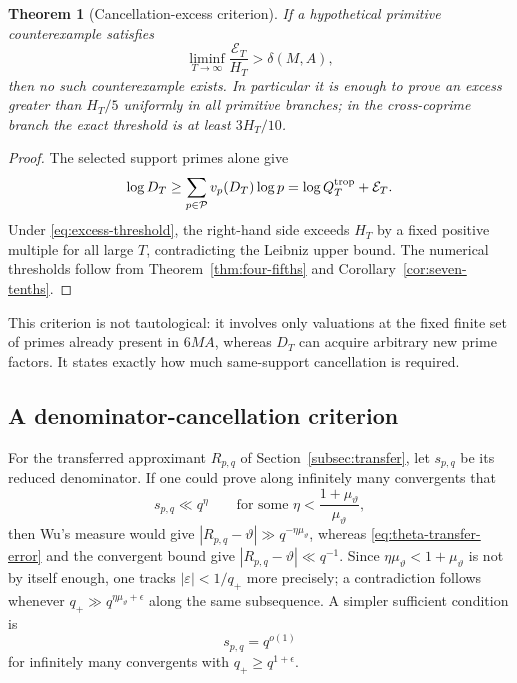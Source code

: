 \documentclass[11pt,oneside]{article}
\newtheorem{theorem}{Theorem}[section]
\theoremstyle{definition}
\theoremstyle{remark}
\begin{document}
\begin{theorem}[Cancellation-excess criterion]\label{thm:excess-criterion}
If a hypothetical primitive counterexample satisfies
\begin{equation}\label{eq:excess-threshold}
 \liminf_{T\to\infty}\frac{\mathcal E_T}{H_T}
 >\delta(M,A),
\end{equation}
then no such counterexample exists.  In particular it is enough to prove an excess greater
than $H_T/5$ uniformly in all primitive branches; in the cross-coprime branch the exact
threshold is at least $3H_T/10$.
\end{theorem}

\begin{proof}
The selected support primes alone give
\[
 \log D_T
 \ge\sum_{p\in\mathcal P}v_p(D_T)\log p
 =\log Q_T^{\rm trop}+\mathcal E_T.
\]
Under \eqref{eq:excess-threshold}, the right-hand side exceeds $H_T$ by a fixed positive
multiple for all large $T$, contradicting the Leibniz upper bound.  The numerical thresholds
follow from Theorem~\ref{thm:four-fifths} and Corollary~\ref{cor:seven-tenths}.
\end{proof}

This criterion is not tautological: it involves only valuations at the fixed finite set of
primes already present in $6MA$, whereas $D_T$ can acquire arbitrary new prime factors.  It
states exactly how much same-support cancellation is required.

\subsection{A denominator-cancellation criterion}

For the transferred approximant $R_{p,q}$ of Section~\ref{subsec:transfer}, let $s_{p,q}$ be
its reduced denominator.  If one could prove along infinitely many convergents that
\begin{equation}\label{eq:poly-reduced-denominator}
 s_{p,q}\ll q^\eta
 \qquad\text{for some }\eta<\frac{1+\mu_\vartheta}{\mu_\vartheta},
\end{equation}
then Wu's measure would give
$|R_{p,q}-\vartheta|\gg q^{-\eta\mu_\vartheta}$, whereas
\eqref{eq:theta-transfer-error} and the convergent bound give
$|R_{p,q}-\vartheta|\ll q^{-1}$.  Since
$\eta\mu_\vartheta<1+\mu_\vartheta$ is not by itself enough, one tracks
$|\varepsilon|<1/q_{+}$ more precisely; a contradiction follows whenever
$q_{+}\gg q^{\eta\mu_\vartheta+\epsilon}$ along the same subsequence.  A simpler sufficient
condition is
\begin{equation}\label{eq:very-small-reduced-denominator}
 s_{p,q}=q^{o(1)}
\end{equation}
for infinitely many convergents with $q_{+}\ge q^{1+\epsilon}$.
\end{document}
